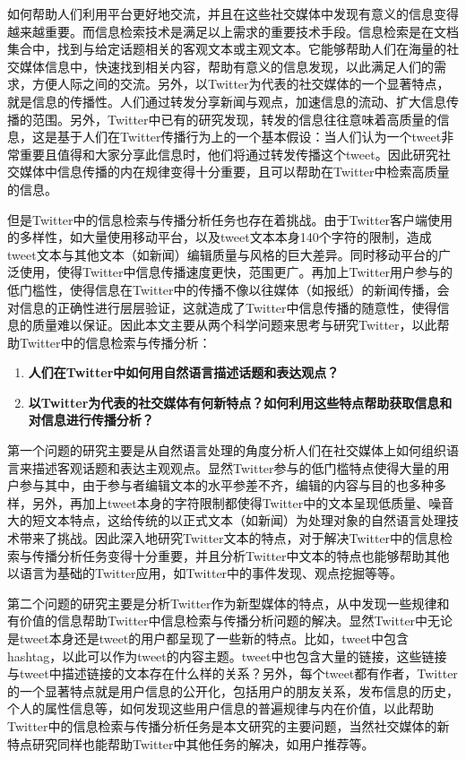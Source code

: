 如何帮助人们利用平台更好地交流，并且在这些社交媒体中发现有意义的信息变得越来越重要。而信息检索技术是满足以上需求的重要技术手段。信息检索是在文档集合中，找到与给定话题相关的客观文本或主观文本。它能够帮助人们在海量的社交媒体信息中，快速找到相关内容，帮助有意义的信息发现，以此满足人们的需求，方便人际之间的交流。另外，以Twitter为代表的社交媒体的一个显著特点，就是信息的传播性。人们通过转发分享新闻与观点，加速信息的流动、扩大信息传播的范围。另外，Twitter中已有的研究发现，转发的信息往往意味着高质量的信息，这是基于人们在Twitter传播行为上的一个基本假设：当人们认为一个tweet非常重要且值得和大家分享此信息时，他们将通过转发传播这个tweet。因此研究社交媒体中信息传播的内在规律变得十分重要，且可以帮助在Twitter中检索高质量的信息。

但是Twitter中的信息检索与传播分析任务也存在着挑战。由于Twitter客户端使用的多样性，如大量使用移动平台，以及tweet文本本身140个字符的限制，造成tweet文本与其他文本（如新闻）编辑质量与风格的巨大差异。同时移动平台的广泛使用，使得Twitter中信息传播速度更快，范围更广。再加上Twitter用户参与的低门槛性，使得信息在Twitter中的传播不像以往媒体（如报纸）的新闻传播，会对信息的正确性进行层层验证，这就造成了Twitter中信息传播的随意性，使得信息的质量难以保证。因此本文主要从两个科学问题来思考与研究Twitter，以此帮助Twitter中的信息检索与传播分析：
    \begin{enumerate}
    \item \textbf{人们在Twitter中如何用自然语言描述话题和表达观点？}
    \item \textbf{以Twitter为代表的社交媒体有何新特点？如何利用这些特点帮助获取信息和对信息进行传播分析？}
    \end{enumerate}  

第一个问题的研究主要是从自然语言处理的角度分析人们在社交媒体上如何组织语言来描述客观话题和表达主观观点。显然Twitter参与的低门槛特点使得大量的用户参与其中，由于参与者编辑文本的水平参差不齐，编辑的内容与目的也多种多样，另外，再加上tweet本身的字符限制都使得Twitter中的文本呈现低质量、噪音大的短文本特点，这给传统的以正式文本（如新闻）为处理对象的自然语言处理技术带来了挑战。因此深入地研究Twitter文本的特点，对于解决Twitter中的信息检索与传播分析任务变得十分重要，并且分析Twitter中文本的特点也能够帮助其他以语言为基础的Twitter应用，如Twitter中的事件发现、观点挖掘等等。

第二个问题的研究主要是分析Twitter作为新型媒体的特点，从中发现一些规律和有价值的信息帮助Twitter中信息检索与传播分析问题的解决。显然Twitter中无论是tweet本身还是tweet的用户都呈现了一些新的特点。比如，tweet中包含hashtag，以此可以作为tweet的内容主题。tweet中也包含大量的链接，这些链接与tweet中描述链接的文本存在什么样的关系？另外，每个tweet都有作者，Twitter的一个显著特点就是用户信息的公开化，包括用户的朋友关系，发布信息的历史，个人的属性信息等，如何发现这些用户信息的普遍规律与内在价值，以此帮助Twitter中的信息检索与传播分析任务是本文研究的主要问题，当然社交媒体的新特点研究同样也能帮助Twitter中其他任务的解决，如用户推荐等。

